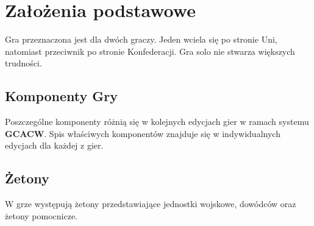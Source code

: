 

\section{Założenia podstawowe}
Gra przeznaczona jest dla dwóch graczy. Jeden wciela się po stronie Uni, natomiast przeciwnik po stronie Konfederacji. Gra solo nie stwarza większych trudności.

\subsection{Komponenty Gry}
Poszczególne komponenty różnią się w kolejnych edycjach gier w ramach systemu \textbf{GCACW}. Spis właściwych komponentów znajduje się w indywidualnych edycjach dla każdej z gier.

\subsection{Żetony}
W grze występują żetony przedstawiające jednostki wojskowe, dowódców oraz żetony pomocnicze.
